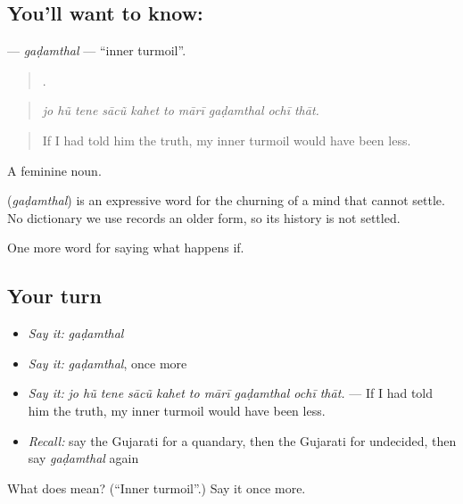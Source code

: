 \subsection*{You'll want to know: }
\textbf{} — \emph{gaḍamthal} — \textquotedblleft{}inner turmoil\textquotedblright{}.

\begin{quote}
         .
\end{quote}

\begin{quote}
\emph{jo hũ tene sācũ kahet to mārī gaḍamthal ochī thāt.}
\end{quote}

\begin{quote}
If I had told him the truth, my inner turmoil would have been less.
\end{quote}

A feminine noun.

\begin{cousinweb}
\textbf{} (\emph{gaḍamthal}) is an expressive word for the churning of a mind that cannot settle. No dictionary we use records an older form, so its history is not settled.
\end{cousinweb}

\begin{grammarlens}[title={What you've built}]
One more word for saying what happens if.
\end{grammarlens}

\subsection*{Your turn}
\begin{itemize}
\raggedright
  \item \emph{Say it:} \emph{gaḍamthal}
  \item \emph{Say it:} \emph{gaḍamthal}, once more
  \item \emph{Say it:} \emph{jo hũ tene sācũ kahet to mārī gaḍamthal ochī thāt.} — If I had told him the truth, my inner turmoil would have been less.
  \item \emph{Recall:} say the Gujarati for a quandary, then the Gujarati for undecided, then say \emph{gaḍamthal} again
\end{itemize}

\begin{tcolorbox}[breakable,colback=teal!4,colframe=teal!35!black,title={Before you move on}]
What does  mean? (\textquotedblleft{}Inner turmoil\textquotedblright{}.) Say it once more.
\end{tcolorbox}
